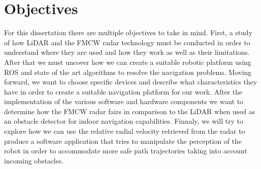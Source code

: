 \section{Objectives}
For this dissertation there are multiple objectives to take in mind. First, a study of how \ac{LiDAR} and the \ac{FMCW} \ac{radar} technology must be conducted in order to understand where they are used and how they work as well as their limitations. After that we must uncover how we can create a suitable robotic platform using \ac{ROS}  and state of the art algorithms to resolve the navigation problems. Moving forward, we want to choose  specific devices and describe what characteristics they have in order to create a suitable navigation platform for our work. After the implementation of the various software and hardware components we want to determine how the \ac{FMCW} \ac{radar} fairs in comparison to the \ac{LiDAR} when used as an obstacle detector for indoor navigation capabilities. Finnaly, we will try to explore how we can use the relative radial velocity retrieved from the \ac{radar} to produce a software application that tries to manipulate the perception of the robot in order to accommodate more safe path trajectories taking into account incoming obstacles. 












